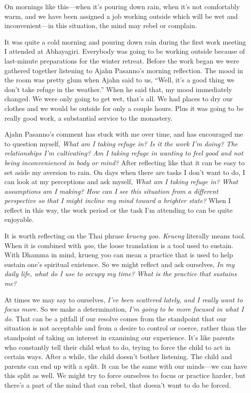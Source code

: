 On mornings like this---when it's pouring down rain, when it's not 
comfortably warm, and we have been assigned a job working outside which 
will be wet and inconvenient---in this situation, the mind may rebel or 
complain.

It was quite a cold morning and pouring down rain during the first work 
meeting I attended at Abhayagiri. Everybody was going to be working 
outside because of last-minute preparations for the winter retreat. 
Before the work began we were gathered together listening to Ajahn 
Pasanno's morning reflection. The mood in the room was pretty glum when 
Ajahn said to us, ``Well, it's a good thing we don't take refuge in the 
weather.'' When he said that, my mood immediately changed. We were only 
going to get wet, that's all. We had places to dry our clothes and we 
would be outside for only a couple hours. Plus it was going to be 
really good work, a substantial service to the monastery.

Ajahn Pasanno's comment has stuck with me over time, and has encouraged 
me to question myself, \emph{What am I taking refuge in? Is it the work 
I'm doing? The relationships I'm cultivating? Am I taking refuge in 
wanting to feel good and not being inconvenienced in body or mind?} 
After reflecting like that it can be easy to set aside my aversion to 
rain. On days when there are tasks I don't want to do, I can look at my 
perceptions and ask myself, \emph{What am I taking refuge in? What 
assumptions am I making? How can I see this situation from a different 
perspective so that I might incline my mind toward a brighter state?} 
When I reflect in this way, the work period or the task I'm attending 
to can be quite enjoyable.


It is worth reflecting on the Thai phrase \emph{krueng yoo. Krueng} 
literally means tool. When it is combined with \emph{yoo,} the loose 
translation is a tool used to sustain. With Dhamma in mind, krueng yoo 
can mean a practice that is used to help sustain one's spiritual 
existence. So we might reflect and ask ourselves, \emph{In my daily 
life, what do I use to occupy my time? What is the practice that 
sustains me?}

At times we may say to ourselves, \emph{I've been scattered lately, and 
I really want to focus more.} So we make a determination, \emph{I'm 
going to be more focused in what I do.} That can be a pitfall if our 
resolve comes from the standpoint that our situation is not acceptable 
and from a desire to control or coerce, rather than the standpoint of 
taking an interest in examining our experience. It's like parents who 
constantly tell their child what to do, trying to force the child to 
act in certain ways. After a while, the child doesn't bother listening. 
The child and parents can end up with a split. It can be the same with 
our minds---we can have this split as well. We might try to force 
ourselves to focus or practice harder, but there's a part of the mind 
that can rebel, that doesn't want to do be forced.

